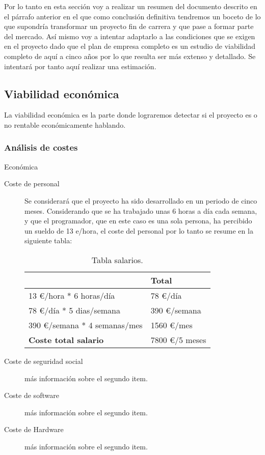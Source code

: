 Por lo tanto en esta sección voy a realizar un resumen del documento descrito en el párrafo anterior en el que como conclusión definitiva tendremos un boceto de lo que supondría transformar un proyecto fin de carrera y que pase a formar parte del mercado. Así mismo voy a intentar adaptarlo a las condiciones que se exigen en el proyecto dado que el plan de empresa completo es un estudio de viabilidad completo de aquí a cinco años por lo que resulta ser más extenso y detallado. Se intentará por tanto aquí realizar una estimación.

\subsection{Viabilidad económica}\label{viabilidad-economica}

La viabilidad económica es la parte donde lograremos detectar si el proyecto es o no rentable económicamente hablando.

\subsubsection{Análisis de costes}\label{costes}
Económica
\begin{description}
	\item[Coste de personal] Se considerará que el proyecto ha sido desarrollado en un periodo de cinco meses.  Considerando que se ha trabajado unas 6 horas a día cada semana, y que el programador, que en este caso es una sola persona, ha percibido un sueldo de 13 e/hora, el coste del personal por lo tanto se resume en la siguiente tabla:
	
\begin{table}[htbp]
\begin{center}
\begin{tabular}{|l|l|}
\hline
 & Total \\
\hline \hline
13 \euro /hora * 6 horas/día &   78 \euro /día \\ \hline
78 \euro /día * 5 dias/semana &   390 \euro /semana \\ \hline
390 \euro /semana * 4 semanas/mes &   1560 \euro /mes \\ \hline
\textbf{Coste total salario} &   7800 \euro /5 meses \\ \hline
\end{tabular}
\caption{Tabla salarios.}
\label{tabla:salarios}
\end{center}
\end{table}
	
	\item[Coste de seguridad social] más información sobre el segundo item.
	
	\item[Coste de software] más información sobre el segundo item.
	
	\item[Coste de Hardware] más información sobre el segundo item.

\end{description}


